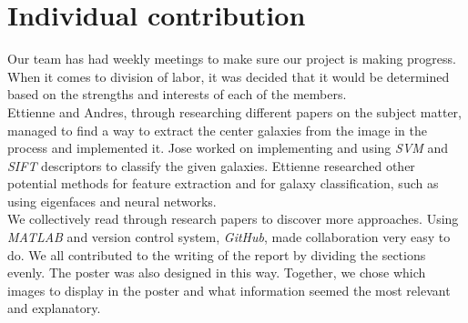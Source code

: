 \documentclass{vldb}
\begin{document}
\section{Individual contribution}

Our team has had weekly meetings to make sure our project is making progress. When it comes to division of labor, it was decided that it would be determined based on the strengths and interests of each of the members. \\

Ettienne and Andres, through researching different papers on the subject matter, managed to find a way to extract the center galaxies from the image in the process and implemented it. Jose worked on implementing and using \emph{SVM} and \emph{SIFT} descriptors to classify the given galaxies. Ettienne researched other potential methods for feature extraction and for galaxy classification, such as using eigenfaces and neural networks. \\

We collectively read through research papers to discover more approaches. Using \emph{MATLAB} and version control system, \emph{GitHub}, made collaboration very easy to do. We all contributed to the writing of the report by dividing the sections evenly. The poster was also designed in this way. Together, we chose which images to display in the poster and what information seemed the most relevant and explanatory.

\balance
\end{document}
